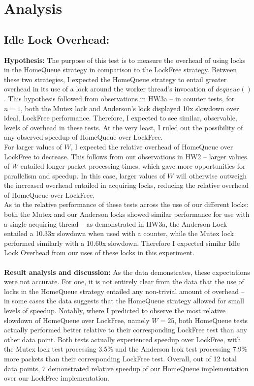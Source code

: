 \documentclass[]{article}
\begin{document}
\section{Analysis}

\subsection{Idle Lock Overhead:}
\textbf{Hypothesis:}
The purpose of this test is to measure the overhead of using locks in the HomeQueue strategy in comparison to the LockFree strategy. Between these two strategies, I expected the HomeQueue strategy to entail greater overhead in its use of a lock around the worker thread's invocation of $dequeue()$. This hypothesis followed from  observations in HW3a -- in counter tests, for $n = 1$, both the Mutex lock and Anderson's lock displayed 10x slowdown over ideal, LockFree performance. Therefore, I expected to see similar, observable, levels of overhead in these tests. At the very least, I ruled out the possibility of any observed speedup of HomeQueue over LockFree. 
\\
For larger values of $W$, I expected the relative overhead of HomeQueue over LockFree to decrease. This follows from our observations in HW2 -- larger values of $W$ entailed longer packet processing times, which gave more opportunities for parallelism and speedup. In this case, larger values of $W$ will otherwise outweigh the increased overhead entailed in acquiring locks, reducing the relative overhead of HomeQueue over LockFree.
\\
As to the relative performance of these tests across the use of our different locks: both the Mutex and our Anderson locks showed similar performance for use with a single acquiring thread -- as demonstrated in HW3a, the Anderson Lock entailed a 10.33x slowdown when used with a counter, while the Mutex lock performed similarly with a 10.60x slowdown. Therefore I expected similar Idle Lock Overhead from our uses of these locks in this experiment.
\\\\
\textbf{Result analysis and discussion:}
As the data demonstrates, these expectations were not accurate. For one, it is not entirely clear from the data that the use of locks in the HomeQueue strategy entailed any non-trivial amount of overhead -- in some cases the data suggests that the HomeQueue strategy allowed for small levels of speedup. Notably, where I predicted to observe the most relative slowdown of HomeQueue over LockFree, namely $W = 25$,  both HomeQueue tests actually performed better relative to their corresponding LockFree test than any other data point. Both tests actually experienced speedup over LockFree, with the Mutex lock test processing 3.5\% and the Anderson lcok test processing 7.9\% more packets than their corresponding LockFree test. Overall, out of 12 total data points, 7 demonstrated relative speedup of our HomeQueue implementation over our LockFree implementation.
\end{document}
